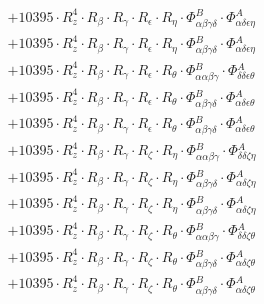 \documentclass{article}
\begin{document}
\begin{subequations}
\begin{gather}
\begin{array}{c}
 \\[0.2em] 		 + 10395 \cdot R_{z}^{4} \cdot R_{\beta{}} \cdot R_{\gamma{}} \cdot R_{\epsilon{}} \cdot R_{\eta{}} \cdot \Phi{}^{B}_{\alpha{}\beta{}\gamma{}\delta{}} \cdot \Phi{}^{A}_{\alpha{}\delta{}\epsilon{}\eta{}} 
 \\[0.2em] 		 + 10395 \cdot R_{z}^{4} \cdot R_{\beta{}} \cdot R_{\gamma{}} \cdot R_{\epsilon{}} \cdot R_{\eta{}} \cdot \Phi{}^{B}_{\alpha{}\beta{}\gamma{}\delta{}} \cdot \Phi{}^{A}_{\alpha{}\delta{}\epsilon{}\eta{}} 
 \\[0.2em] 		 + 10395 \cdot R_{z}^{4} \cdot R_{\beta{}} \cdot R_{\gamma{}} \cdot R_{\epsilon{}} \cdot R_{\theta{}} \cdot \Phi{}^{B}_{\alpha{}\alpha{}\beta{}\gamma{}} \cdot \Phi{}^{A}_{\delta{}\delta{}\epsilon{}\theta{}} 
 \\[0.2em] 		 + 10395 \cdot R_{z}^{4} \cdot R_{\beta{}} \cdot R_{\gamma{}} \cdot R_{\epsilon{}} \cdot R_{\theta{}} \cdot \Phi{}^{B}_{\alpha{}\beta{}\gamma{}\delta{}} \cdot \Phi{}^{A}_{\alpha{}\delta{}\epsilon{}\theta{}} 
 \\[0.2em] 		 + 10395 \cdot R_{z}^{4} \cdot R_{\beta{}} \cdot R_{\gamma{}} \cdot R_{\epsilon{}} \cdot R_{\theta{}} \cdot \Phi{}^{B}_{\alpha{}\beta{}\gamma{}\delta{}} \cdot \Phi{}^{A}_{\alpha{}\delta{}\epsilon{}\theta{}} 
 \\[0.2em] 		 + 10395 \cdot R_{z}^{4} \cdot R_{\beta{}} \cdot R_{\gamma{}} \cdot R_{\zeta{}} \cdot R_{\eta{}} \cdot \Phi{}^{B}_{\alpha{}\alpha{}\beta{}\gamma{}} \cdot \Phi{}^{A}_{\delta{}\delta{}\zeta{}\eta{}} 
 \\[0.2em] 		 + 10395 \cdot R_{z}^{4} \cdot R_{\beta{}} \cdot R_{\gamma{}} \cdot R_{\zeta{}} \cdot R_{\eta{}} \cdot \Phi{}^{B}_{\alpha{}\beta{}\gamma{}\delta{}} \cdot \Phi{}^{A}_{\alpha{}\delta{}\zeta{}\eta{}} 
 \\[0.2em] 		 + 10395 \cdot R_{z}^{4} \cdot R_{\beta{}} \cdot R_{\gamma{}} \cdot R_{\zeta{}} \cdot R_{\eta{}} \cdot \Phi{}^{B}_{\alpha{}\beta{}\gamma{}\delta{}} \cdot \Phi{}^{A}_{\alpha{}\delta{}\zeta{}\eta{}} 
 \\[0.2em] 		 + 10395 \cdot R_{z}^{4} \cdot R_{\beta{}} \cdot R_{\gamma{}} \cdot R_{\zeta{}} \cdot R_{\theta{}} \cdot \Phi{}^{B}_{\alpha{}\alpha{}\beta{}\gamma{}} \cdot \Phi{}^{A}_{\delta{}\delta{}\zeta{}\theta{}} 
 \\[0.2em] 		 + 10395 \cdot R_{z}^{4} \cdot R_{\beta{}} \cdot R_{\gamma{}} \cdot R_{\zeta{}} \cdot R_{\theta{}} \cdot \Phi{}^{B}_{\alpha{}\beta{}\gamma{}\delta{}} \cdot \Phi{}^{A}_{\alpha{}\delta{}\zeta{}\theta{}} 
 \\[0.2em] 		 + 10395 \cdot R_{z}^{4} \cdot R_{\beta{}} \cdot R_{\gamma{}} \cdot R_{\zeta{}} \cdot R_{\theta{}} \cdot \Phi{}^{B}_{\alpha{}\beta{}\gamma{}\delta{}} \cdot \Phi{}^{A}_{\alpha{}\delta{}\zeta{}\theta{}} 

\end{array}
\end{gather}
\end{subequations}
\end{document}

